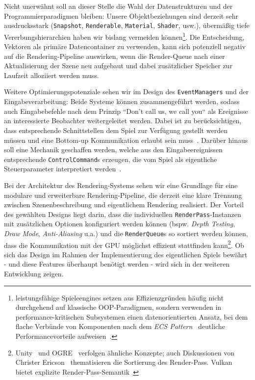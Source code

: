 Nicht unerwähnt soll an dieser Stelle die Wahl der Datenstrukturen und der Programmierparadigmen bleiben: Unsere Objektbeziehungen sind derzeit sehr ausdrucksstark (\texttt{Snapshot}, \texttt{Renderable}, \texttt{Material}, \texttt{Shader}, usw.), übermäßig tiefe Vererbungshierarchien haben wir bislang vermeiden können\footnote{
leistungsfähige Spieleengines setzen aus Effizienzgründen häufig nicht durchgehend auf klassische OOP-Paradigmen, sondern verwenden in performance-kritischen Subsystemen einen datenorientierten Ansatz, bei dem flache Verbünde von Komponenten nach dem \textit{ECS Pattern}~\cite[]{RCCK25} deutliche Performancevorteile aufweisen~\cite[]{WWM22}.
}.
Die Entscheidung, Vektoren als primäre Datencontainer zu verwenden, kann sich potenziell negativ auf die Rendering-Pipeline auswirken, wenn die Render-Queue nach einer Aktualisierung der Szene neu aufgebaut und dabei zusätzlicher Speicher zur Laufzeit alloziiert werden muss.\par

Weitere Optimierungspotenziale sehen wir im Design des \texttt{EventManagers} und der Eingabeverarbeitung: Beide Systeme können zusammengeführt werden, sodass auch Eingabebefehle nach dem Prinzip ``Don't call us, we call you`` als Ereignisse an interessierte Beobachter weitergeleitet werden.
Dabei ist zu berücksichtigen, dass entsprechende Schnittstellen dem Spiel zur Verfügung gestellt werden müssen und eine Bottom-up Kommunikation erlaubt sein muss~\cite[]{BMRS+96}.
Darüber hinaus soll eine Mechanik geschaffen werden, welche aus den Eingabeereignissen entsprechende \texttt{ControlCommand}s erzeugen, die vom Spiel als eigentliche  Steuerparameter interpretiert werden~\cite[21 ff.]{Nys14}.\par

Bei der Architektur des Rendering-Systems sehen wir eine Grundlage für eine modulare und erweiterbare Rendering-Pipeline, die derzeit eine klare Trennung zwischen Szenenbeschreibung und eigentlichem Rendering realisiert.
Der Vorteil des gewählten Designs liegt darin, dass die individuellen \texttt{RenderPass}-Instanzen mit zusätzlichen Optionen konfiguriert werden können (bspw. \textit{Depth Testing}, \textit{Draw Mode}, \textit{Anti-Aliasing} u.a.) und die \texttt{RenderQueue}s so sortiert werden können, dass die Kommunikation mit der GPU möglichst effizient stattfinden kann\footnote{
    Unity~\cite[]{UnityRenderQueue} und OGRE~\cite[]{OgreRenderQueue} verfolgen ähnliche Konzepte; auch Diskussionen von Christer Ericson~\cite[]{ChristerEricson} thematisieren die Sortierung des Render-Pass. Vulkan bietet explizite Render-Pass-Semantik~\cite[]{VulkanRenderPass}
}.
Ob sich das Design im Rahmen der Implementierung des eigentlichen Spiels bewährt - und diese Features überhaupt benötigt werden - wird sich in der weiteren Entwicklung zeigen.




